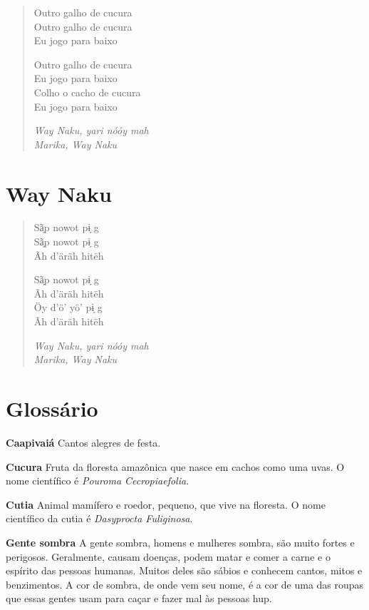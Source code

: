 \begin{quote}
Outro galho de cucura\\
Outro galho de cucura\\
Eu jogo para baixo

Outro galho de cucura\\
Eu jogo para baixo\\
Colho o cacho de cucura\\
Eu jogo para baixo

\textit{Way Naku, yari nóóy mah\\
Marika, Way Naku}
\end{quote}

\chapter{Way Naku}

\begin{quote}
Sã̗p nowot pɨ̗ g\\
Sã̗p nowot pɨ̗ g\\
Ãh d’äräh hitëh

Sã̗p nowot pɨ̗ g\\
Ãh d’äräh hitëh\\
Öy d’ö’ yö’ pɨ̗ g\\
Ãh d’äräh hitëh

\textit{Way Naku, yari nóóy mah\\
Marika, Way Naku}
\end{quote}

\chapter{Glossário}


\textbf{Caapivaiá} Cantos alegres de festa.

\textbf{Cucura} Fruta da floresta amazônica que nasce em cachos
como uma uvas. O nome científico é \textit{Pouroma Cecropiaefolia}.

\textbf{Cutia} Animal mamífero e roedor, pequeno, que vive na floresta. O nome
científico da cutia é \textit{Dasyprocta Fuliginosa}.

\textbf{Gente sombra} A gente sombra, homens e mulheres sombra, são
muito fortes e perigosos. Geralmente, causam doenças, podem matar
e comer a carne e o espírito das pessoas humanas. Muitos deles
são sábios e conhecem cantos, mitos e benzimentos. A cor de
sombra, de onde vem seu nome, é a cor de uma das roupas que essas gentes
usam para caçar e fazer mal às pessoas hup.

